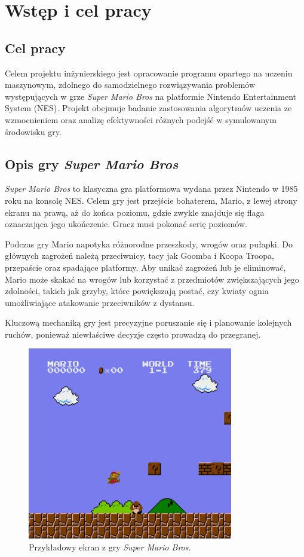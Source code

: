 \chapter{Wstęp i cel pracy}

\section{Cel pracy}
Celem projektu inżynierskiego jest opracowanie programu opartego na uczeniu maszynowym, zdolnego do samodzielnego rozwiązywania problemów występujących w grze \textit{Super Mario Bros} na platformie Nintendo Entertainment System (NES).
Projekt obejmuje badanie zastosowania algorytmów uczenia ze wzmocnieniem oraz analizę efektywności różnych podejść w symulowanym środowisku gry.

\section{Opis gry \textit{Super Mario Bros}}

\textit{Super Mario Bros} to klasyczna gra platformowa wydana przez Nintendo w 1985 roku na konsolę NES.
Celem gry jest przejście bohaterem, Mario, z lewej strony ekranu na prawą, aż do końca poziomu, gdzie zwykle znajduje się flaga oznaczająca jego ukończenie.
Gracz musi pokonać serię poziomów.

Podczas gry Mario napotyka różnorodne przeszkody, wrogów oraz pułapki.
Do głównych zagrożeń należą przeciwnicy, tacy jak Goomba i Koopa Troopa, przepaście oraz spadające platformy.
Aby unikać zagrożeń lub je eliminować, Mario może skakać na wrogów lub korzystać z przedmiotów zwiększających jego zdolności, takich jak grzyby, które powiększają postać, czy kwiaty ognia umożliwiające atakowanie przeciwników z dystansu.

Kluczową mechaniką gry jest precyzyjne poruszanie się i planowanie kolejnych ruchów, ponieważ niewłaściwe decyzje często prowadzą do przegranej.

\begin{figure}[h!]
	\centering
	\includegraphics[width=0.8\textwidth]{img/screenshot_mario.png}
	\caption{Przykładowy ekran z gry \textit{Super Mario Bros.}}
	\label{fig:screenshot_mario}
\end{figure}

